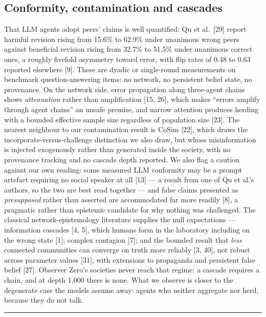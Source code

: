 \documentclass[pdflatex,sn-basic]{sn-jnl}
\begin{document}
\hypertarget{conformity-contamination-and-cascades}{%
\subsection{Conformity, contamination and cascades}\label{conformity-contamination-and-cascades}}

That LLM agents adopt peers' claims is well
quantified: Qu et al.~{[}29{]} report harmful revision rising from 15.6\% to 62.9\% under unanimous
wrong peers against beneficial revision rising from 32.7\% to 51.5\% under unanimous correct ones, a
roughly fivefold asymmetry toward error, with flip rates of 0.48 to 0.63 reported elsewhere {[}9{]}.
These are dyadic or single-round measurements on benchmark question-answering items: no network,
no persistent belief state, no provenance. On the network side, error propagation along
three-agent chains shows \emph{attenuation} rather than amplification {[}15, 26{]}, which makes ``errors
amplify through agent chains'' an unsafe premise, and narrow attention produces herding with a
bounded effective sample size regardless of population size {[}23{]}. The nearest neighbour to our
contamination result is CoSim {[}22{]}, which draws the incorporate-versus-challenge distinction we
also draw, but whose misinformation is injected exogenously rather than generated inside the
society, with no provenance tracking and no cascade depth reported. We also flag a caution against
our own reading: some measured LLM conformity may be a prompt artefact requiring no social speaker
at all {[}13{]} --- a result from one of Qu et al.'s authors, so the two are best read together --- and false
claims presented as \emph{presupposed} rather than asserted are accommodated far more readily {[}8{]}, a
pragmatic rather than epistemic candidate for why nothing was challenged. The classical network-epistemology literature supplies the null
expectations --- information cascades {[}4, 5{]}, which humans form in the laboratory including on
the wrong state {[}1{]}; complex contagion {[}7{]}; and the bounded result that \emph{less} connected
communities can converge on truth more reliably {[}3, 40{]}, not robust across parameter values
{[}31{]}, with extensions to propaganda and persistent false belief {[}27{]}. Observer Zero's
societies never reach that regime: a cascade requires a chain, and at depth 1.000 there is
none. What we observe is closer to the degenerate case the models assume away: agents who
neither aggregate nor herd, because they do not talk.

\begin{center}\rule{0.5\linewidth}{0.5pt}\end{center}
\end{document}
